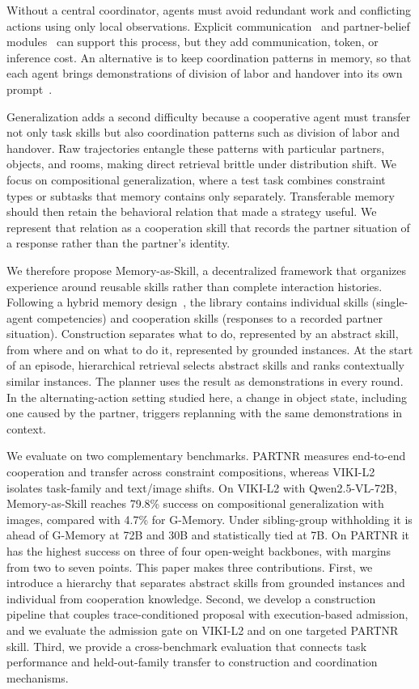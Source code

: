 \documentclass{article}
\theoremstyle{plain}
\theoremstyle{definition}
\theoremstyle{remark}
\begin{document}
Without a central coordinator, agents must avoid redundant work and conflicting actions using only local observations. Explicit communication~\citep{zhang2023building} and partner-belief modules~\citep{zhang2024proagent,li2023theory} can support this process, but they add communication, token, or inference cost. An alternative is to keep coordination patterns in memory, so that each agent brings demonstrations of division of labor and handover into its own prompt~\citep{omidshafiei2017deep}.
 
Generalization adds a second difficulty because a cooperative agent must transfer not only task skills but also coordination patterns such as division of labor and handover. Raw trajectories entangle these patterns with particular partners, objects, and rooms, making direct retrieval brittle under distribution shift. We focus on compositional generalization, where a test task combines constraint types or subtasks that memory contains only separately. Transferable memory should then retain the behavioral relation that made a strategy useful. We represent that relation as a cooperation skill that records the partner situation of a response rather than the partner's identity.
 
 
We therefore propose Memory-as-Skill, a decentralized framework that organizes experience around reusable skills rather than complete interaction histories. Following a hybrid memory design~\citep{hu2025memory}, the library contains individual skills (single-agent competencies) and cooperation skills (responses to a recorded partner situation). Construction separates what to do, represented by an abstract skill, from where and on what to do it, represented by grounded instances. At the start of an episode, hierarchical retrieval selects abstract skills and ranks contextually similar instances. The planner uses the result as demonstrations in every round. In the alternating-action setting studied here, a change in object state, including one caused by the partner, triggers replanning with the same demonstrations in context.
 
We evaluate on two complementary benchmarks. PARTNR measures end-to-end cooperation and transfer across constraint compositions, whereas VIKI-L2 isolates task-family and text/image shifts. On VIKI-L2 with Qwen2.5-VL-72B, Memory-as-Skill reaches 79.8\% success on compositional generalization with images, compared with 4.7\% for G-Memory. Under sibling-group withholding it is ahead of G-Memory at 72B and 30B and statistically tied at 7B. On PARTNR it has the highest success on three of four open-weight backbones, with margins from two to seven points. This paper makes three contributions. First, we introduce a hierarchy that separates abstract skills from grounded instances and individual from cooperation knowledge. Second, we develop a construction pipeline that couples trace-conditioned proposal with execution-based admission, and we evaluate the admission gate on VIKI-L2 and on one targeted PARTNR skill. Third, we provide a cross-benchmark evaluation that connects task performance and held-out-family transfer to construction and coordination mechanisms.
 
\end{document}

